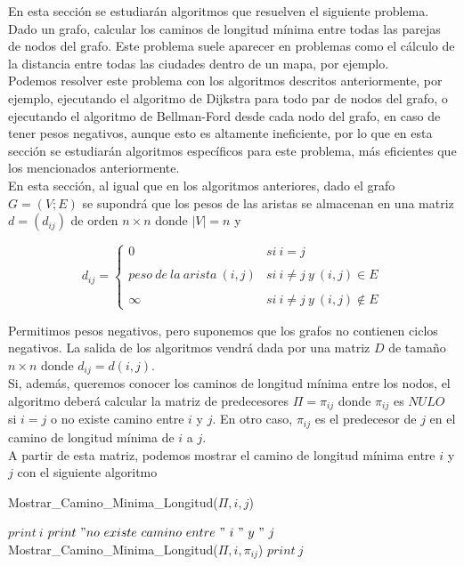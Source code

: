 En esta sección se estudiarán algoritmos que resuelven el siguiente problema. \\

Dado un grafo, calcular los caminos de longitud mínima entre todas las parejas de nodos del grafo. Este problema suele aparecer en problemas como el cálculo de la distancia entre todas las ciudades dentro de un mapa, por ejemplo. \\

Podemos resolver este problema con los algoritmos descritos anteriormente, por ejemplo, ejecutando el algoritmo de Dijkstra para todo par de nodos del grafo, o ejecutando el algoritmo de Bellman-Ford desde cada nodo del grafo, en caso de tener pesos negativos, aunque esto es altamente ineficiente, por lo que en esta sección se estudiarán algoritmos específicos para este problema, más eficientes que los mencionados anteriormente. \\

En esta sección, al igual que en los algoritmos anteriores, dado el grafo $G=(V;E)$ se supondrá que los pesos de las aristas se almacenan en una matriz $d=(d_{ij})$ de orden $n\times n$ donde $|V|=n$ y

$$d_{ij}= \left\{ \begin{array}{lcc}
	0 &   si\ i=j \\
	\\ peso\ de\ la\ arista\ (i,j) &  si\ i\neq j\ y\ (i,j)\in E \\
	\\ \infty & si\ i\neq j\ y\ (i,j)\notin E
\end{array}
\right.$$

Permitimos pesos negativos, pero suponemos que los grafos no contienen ciclos negativos. La salida de los algoritmos vendrá dada por una matriz $D$ de tamaño $n\times n$ donde $d_{ij}=d(i,j)$. \\

Si, además, queremos conocer los caminos de longitud mínima entre los nodos, el algoritmo deberá calcular la matriz de predecesores $\Pi=\pi_{ij}$  donde $\pi_{ij}$ es $NULO$ si $i=j$ o no existe camino entre $i$ y $j$. En otro caso, $\pi_{ij}$ es el predecesor de $j$ en el camino de longitud mínima de $i$ a $j$. \\

A partir de esta matriz, podemos mostrar el camino de longitud mínima entre $i$ y $j$ con el siguiente algoritmo

\begin{breakablealgorithm}
	\caption{Mostrar\_Camino\_Minima\_Longitud($\Pi,i,j$)}
	\begin{algorithmic}[1]
			\State $print\ i$
			\State $print\ "no\ existe\ camino\ entre\ "\ i\ "\ y\ "\ j$
		\Else
			\State Mostrar\_Camino\_Minima\_Longitud($\Pi,i,\pi_{ij}$)
		\EndIf
		\State $print\ j$
	\end{algorithmic}
\end{breakablealgorithm}

